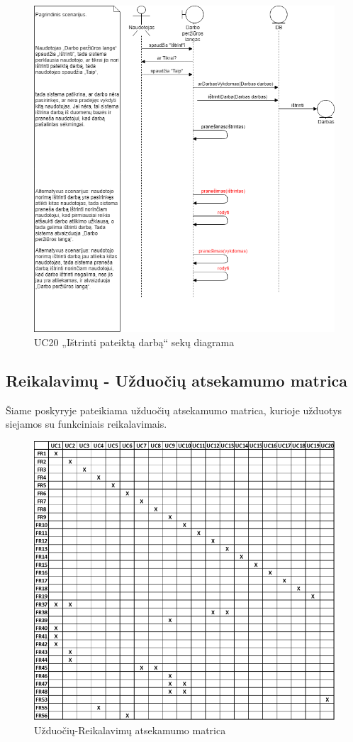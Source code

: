 \documentclass{VUMIFPSbakalaurinis}
\begin{document}
\begin{figure}[H]
	\centering
	\includegraphics[scale=0.6]{img/Sequence/SD20}
	\caption{UC20 „Ištrinti pateiktą darbą“ sekų diagrama}
	\label{img:uc20seq}
\end{figure}

\subsection{Reikalavimų - Užduočių atsekamumo matrica}
Šiame poskyryje pateikiama užduočių atsekamumo matrica, kurioje užduotys siejamos su funkciniais reikalavimais.
\begin{figure}[H]
    \centering
    \includegraphics[scale=0.8]{img/UC-matrix}
    \caption{Užduočių-Reikalavimų atsekamumo matrica}
    \label{img:uc-matrix}
\end{figure}
\end{document}
